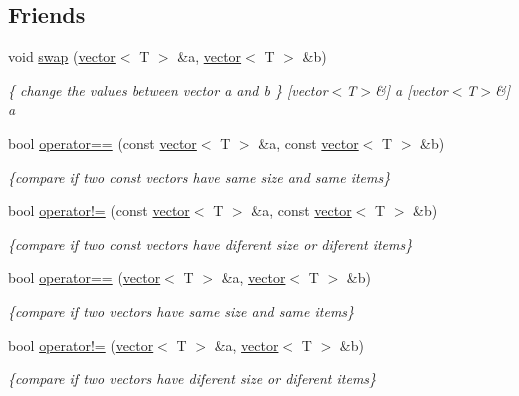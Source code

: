 \subsection*{Friends}
\begin{DoxyCompactItemize}
\item 
\mbox{\label{classvector_a07c763be433bb10d84207279f5d74d64}} 
void \hyperlink{classvector_a07c763be433bb10d84207279f5d74d64}{swap} (\hyperlink{classvector}{vector}$<$ T $>$ \&a, \hyperlink{classvector}{vector}$<$ T $>$ \&b)
\begin{DoxyCompactList}\small\item\em \{ change the values between vector a and b \} \mbox{[}vector$<$\+T$>$\&\mbox{]} a \mbox{[}vector$<$\+T$>$\&\mbox{]} a \end{DoxyCompactList}\item 
bool \hyperlink{classvector_a201a9e7f4b5e89f2a6a04f48729ce1f7}{operator==} (const \hyperlink{classvector}{vector}$<$ T $>$ \&a, const \hyperlink{classvector}{vector}$<$ T $>$ \&b)
\begin{DoxyCompactList}\small\item\em \{compare if two const vectors have same size and same items\} \end{DoxyCompactList}\item 
bool \hyperlink{classvector_a12f2274ae20637a056b99459320942f7}{operator!=} (const \hyperlink{classvector}{vector}$<$ T $>$ \&a, const \hyperlink{classvector}{vector}$<$ T $>$ \&b)
\begin{DoxyCompactList}\small\item\em \{compare if two const vectors have diferent size or diferent items\} \end{DoxyCompactList}\item 
bool \hyperlink{classvector_a668214f1413a43739ca682fb958d6d78}{operator==} (\hyperlink{classvector}{vector}$<$ T $>$ \&a, \hyperlink{classvector}{vector}$<$ T $>$ \&b)
\begin{DoxyCompactList}\small\item\em \{compare if two vectors have same size and same items\} \end{DoxyCompactList}\item 
bool \hyperlink{classvector_a6e1890e0a27d2c159aa4a53bda3d8b5b}{operator!=} (\hyperlink{classvector}{vector}$<$ T $>$ \&a, \hyperlink{classvector}{vector}$<$ T $>$ \&b)
\begin{DoxyCompactList}\small\item\em \{compare if two vectors have diferent size or diferent items\} \end{DoxyCompactList}\end{DoxyCompactItemize}


